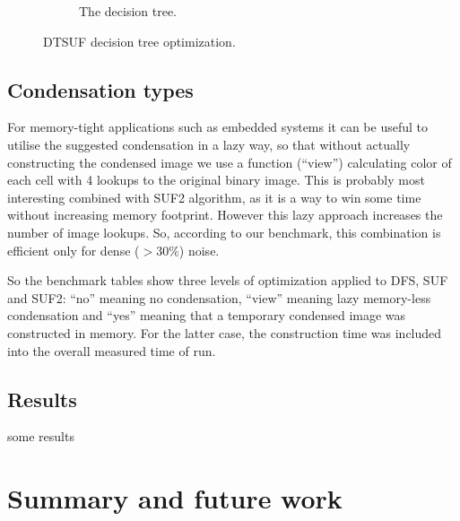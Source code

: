 \documentclass{llncs}
\begin{document}
\begin{figure}
\begin{subfigure}{0.65\linewidth}
    \caption{The decision tree.}
  \end{subfigure}
  \caption{DTSUF decision tree optimization.}
  \label{fig:dtsuf}
\end{figure}

\subsection{Condensation types}

For memory-tight applications such as embedded systems it can be useful to
utilise the suggested condensation in a lazy way, so that without actually
constructing the condensed image we use a function (``view'') calculating color of
each cell with 4 lookups to the original binary image.
This is probably most interesting combined with SUF2 algorithm, as it is a way
to win some time without increasing memory footprint.
However this lazy approach increases the number of image lookups.
So, according to our benchmark, this combination is efficient only for dense
($>30\%$) noise.

So the benchmark tables show three levels of optimization applied to
DFS, SUF and SUF2:
``no'' meaning no condensation, ``view'' meaning lazy memory-less condensation
and ``yes'' meaning that a temporary condensed image was constructed in memory.
For the latter case, the construction time was included into the overall measured
time of run.

\subsection{Results}

some results

\section{Summary and future work}

\newcommand{\inputtable}[2]{
  \begin{table}[p]
    \centering
    
    \caption{Average milliseconds of cpu time per run on noise images $#1 \times #2$ px}
    \label{tab:noise#1x#2}
  \end{table} }
\end{document}
